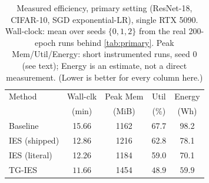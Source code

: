 \documentclass{article}
\newcommand{\win}[1]{\cellcolor{tgwin}#1}
\newcommand{\lose}[1]{\cellcolor{tglose}#1}
\theoremstyle{plain}
\theoremstyle{definition}
\theoremstyle{remark}
\begin{document}
\begin{table}[h]
\caption{Measured efficiency, primary setting (ResNet-18, CIFAR-10, SGD exponential-LR), single RTX 5090. Wall-clock: mean over seeds $\{0,1,2\}$ from the real 200-epoch runs behind \cref{tab:primary}. Peak Mem/Util/Energy: short instrumented runs, seed 0 (see text); Energy is an estimate, not a direct measurement. (Lower is better for every column here.)}
\label{tab:efficiency}
\vskip 0.1in
\begin{center}
\begin{small}
\setlength{\tabcolsep}{4pt}
\begin{tabular}{lcccc}
\toprule
Method & Wall-clk & Peak Mem & Util & Energy \\
 & (min) & (MiB) & (\%) & (Wh) \\
\midrule
Baseline & 15.66 & 1162 & 67.7 & 98.2 \\
IES (shipped) & 12.86 & 1216 & 62.8 & 78.1 \\
IES (literal) & 12.26 & 1184 & 59.0 & 70.1 \\
\win{TG-IES} & \win{$\mathbf{11.66}$} & \lose{1454} & \win{$\mathbf{48.9}$} & \win{$\mathbf{59.9}$} \\
\bottomrule
\end{tabular}
\end{small}
\end{center}
\vskip -0.1in
\end{table}
\end{document}
